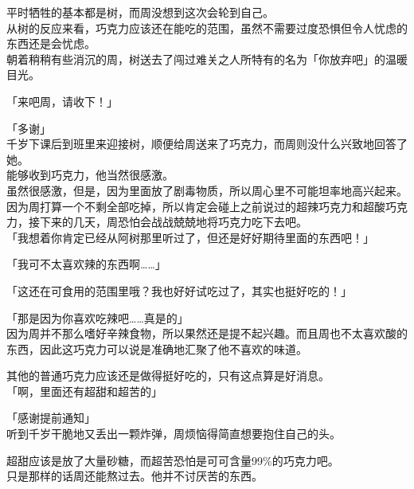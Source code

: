 平时牺牲的基本都是树，而周没想到这次会轮到自己。\\

从树的反应来看，巧克力应该还在能吃的范围，虽然不需要过度恐惧但令人忧虑的东西还是会忧虑。\\

朝着稍稍有些消沉的周，树送去了闯过难关之人所特有的名为「你放弃吧」的温暖目光。\\

\vspace{2\baselineskip}

「来吧周，请收下！」

「多谢」\\

千岁下课后到班里来迎接树，顺便给周送来了巧克力，而周则没什么兴致地回答了她。\\

能够收到巧克力，他当然很感激。\\

虽然很感激，但是，因为里面放了剧毒物质，所以周心里不可能坦率地高兴起来。\\

因为周打算一个不剩全部吃掉，所以肯定会碰上之前说过的超辣巧克力和超酸巧克力，接下来的几天，周恐怕会战战兢兢地将巧克力吃下去吧。\\

「我想着你肯定已经从阿树那里听过了，但还是好好期待里面的东西吧！」

「我可不太喜欢辣的东西啊……」

「这还在可食用的范围里哦？我也好好试吃过了，其实也挺好吃的！」

「那是因为你喜欢吃辣吧……真是的」\\

因为周并不那么嗜好辛辣食物，所以果然还是提不起兴趣。而且周也不太喜欢酸的东西，因此这巧克力可以说是准确地汇聚了他不喜欢的味道。

其他的普通巧克力应该还是做得挺好吃的，只有这点算是好消息。\\

「啊，里面还有超甜和超苦的」

「感谢提前通知」\\

听到千岁干脆地又丢出一颗炸弹，周烦恼得简直想要抱住自己的头。

超甜应该是放了大量砂糖，而超苦恐怕是可可含量99\%的巧克力吧。\\

只是那样的话周还能熬过去。他并不讨厌苦的东西。\\

